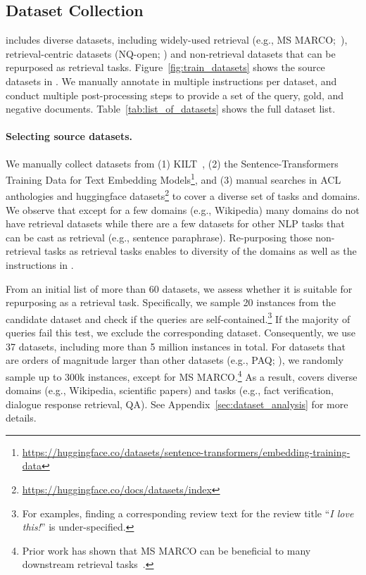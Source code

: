 \subsection{Dataset Collection}
\label{sec:dataset_collecitons}
\rib includes diverse datasets, including widely-used retrieval (e.g., MS MARCO;~\citealt{msmarco}), retrieval-centric datasets (NQ-open; \citealt{47761}) and non-retrieval datasets that can be repurposed as retrieval tasks. 
Figure~\ref{fig:train_datasets} shows the source datasets in \rib.  
{We manually annotate in multiple instructions per dataset}, and conduct multiple post-processing steps to provide a set of the query, gold, and negative documents. 
Table~\ref{tab:list_of_datasets} shows the full dataset list.
\paragraph{Selecting source datasets.}
We manually collect datasets from (1) KILT~\cite{petroni-etal-2021-kilt}, (2) the Sentence-Transformers Training Data for Text Embedding Models\footnote{\url{https://huggingface.co/datasets/sentence-transformers/embedding-training-data}}, and (3) manual searches in ACL anthologies and huggingface datasets\footnote{\url{https://huggingface.co/docs/datasets/index}} to cover a diverse set of tasks and domains. 
{
We observe that except for a few domains (e.g., Wikipedia) many domains do not have retrieval datasets while there are a few datasets for other NLP tasks that can be cast as retrieval (e.g., sentence paraphrase). 
Re-purposing those non-retrieval tasks as retrieval tasks enables to diversity of the domains as well as the instructions in \rib.  
}

From an initial list of more than {60} datasets, we assess whether it is suitable for repurposing as a retrieval task. Specifically, we sample 20 instances from the candidate dataset and check if the queries are self-contained.\footnote{For examples, finding a corresponding review text for the review title ``{\it I love this!}'' is under-specified.}
If the majority of queries fail this test, we exclude the corresponding dataset.
%
%
Consequently, we use 37 datasets, including more than {5 million} instances in total. 
For datasets that are orders of magnitude larger than other datasets (e.g., PAQ; \citealt{lewis-etal-2021-paq}), we randomly sample up to 300k instances, except for MS MARCO.\footnote{Prior work has shown that MS MARCO can be beneficial to many downstream retrieval tasks~\cite{izacard2022unsupervised}.}
As a result, \rib covers diverse domains (e.g., Wikipedia, scientific papers) and tasks (e.g., fact verification, dialogue response retrieval, QA). See Appendix~\ref{sec:dataset_analysis} for more details.

